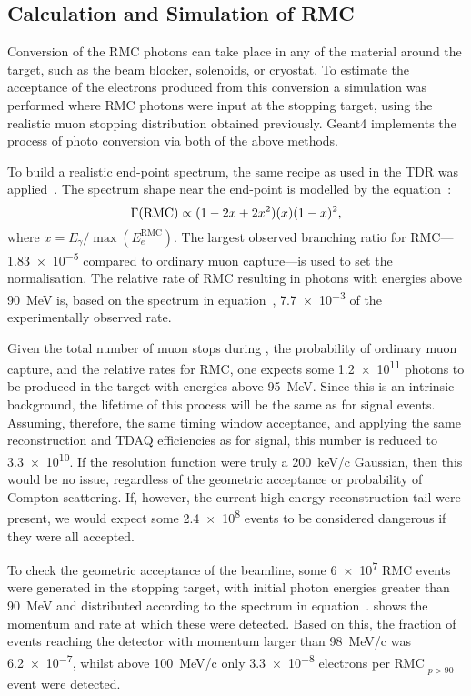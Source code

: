 \subsection{Calculation and Simulation of RMC}
Conversion of the RMC photons can take place in any of the material around the target, such as the beam blocker, solenoids, or cryostat.
To estimate the acceptance of the electrons produced from this conversion a simulation was performed where RMC photons were input at the stopping target, using the realistic muon stopping distribution obtained previously.
Geant4 implements the process of photo conversion via both of the above methods.

To build a realistic end-point spectrum, the same recipe as used in the \phaseI TDR was applied~\cite{TDR2016}.
The spectrum shape near the end-point is modelled by the equation~\cite{CHRISTILLIN1980331}:
\begin{equation}
	\eqlabel{bg:rmc:spect}
	\Gamma(\textrm{RMC})\propto(1-2x+2x^2)(x)(1-x)^2,
\end{equation}
where $x=E_\gamma/\max(E_e^\textrm{RMC})$.
The largest observed branching ratio for \ac{RMC}---\num{1.83e-5} compared to ordinary muon capture---is used to set the normalisation.
The relative rate of \ac{RMC} resulting in photons with energies above 90~MeV is, based on the spectrum in equation~, \num{7.7e-3} of the experimentally observed rate.
\FigRMCSimResults

Given the total number of muon stops during \phaseII, the probability of ordinary muon capture, and the relative rates for \ac{RMC}, one expects some \num{1.2e11} photons to be produced in the target with energies above 95~MeV.
Since this is an intrinsic background, the lifetime of this process will be the same as for signal events. 
Assuming, therefore, the same timing window acceptance, and applying the same reconstruction and TDAQ efficiencies as for signal, this number is reduced to \num{3.3e10}.
If the resolution function were truly a 200~keV/c Gaussian, then this would be no issue, regardless of the geometric acceptance or probability of Compton scattering.
If, however, the current \phaseI high-energy reconstruction tail were present, we would expect some \num{2.4e8} events to be considered dangerous if they were all accepted.

To check the geometric acceptance of the beamline, some \num{6e7} RMC events were generated in the stopping target, with initial photon energies greater than 90~MeV and distributed according to the spectrum in equation~.
 shows the momentum and rate at which these were detected.
Based on this, the fraction of events reaching the detector with momentum larger than 98~MeV/c was \num{6.2e-7}, whilst above 100~MeV/c only \num{3.3e-8} electrons per \ac{RMC}$|_{p>90}$ event were detected.

